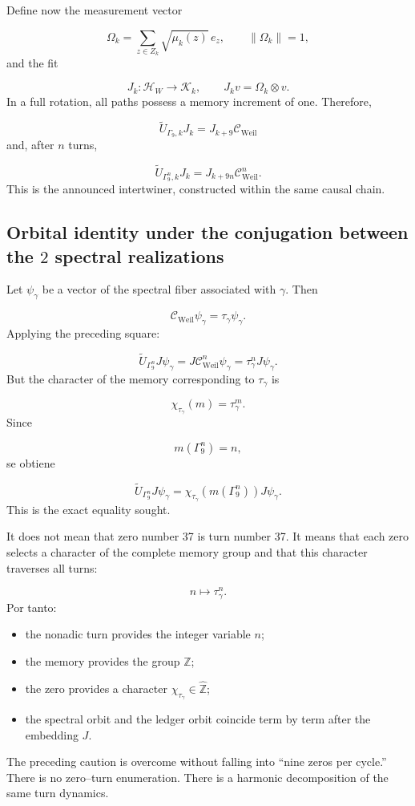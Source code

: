 Define now the measurement vector\par
\[
\Omega_k
=
\sum_{z\in Z_k}
\sqrt{\mu_k(z)}\,e_z,
\qquad
\|\Omega_k\|=1,
\]
and the fit\par
\[
J_k:\mathcal H_W\longrightarrow\mathscr K_k,
\qquad
J_kv=\Omega_k\otimes v.
\]
In a full rotation, all paths possess a memory increment of one. Therefore,\par
\[
\boxed{
\widetilde U_{\Gamma_9,k}J_k
=
J_{k+9}\mathcal C_{\mathrm{Weil}}
}
\]
and, after \(n\) turns,\par
\[
\boxed{
\widetilde U_{\Gamma_9^n,k}J_k
=
J_{k+9n}\mathcal C_{\mathrm{Weil}}^n.
}
\]
This is the announced intertwiner, constructed within the same causal chain.\par
{}
\subsection{Orbital identity under the conjugation between the \(2\) spectral realizations}
Let \(\psi_\gamma\) be a vector of the spectral fiber associated with \(\gamma\). Then\par
\[
\mathcal C_{\mathrm{Weil}}\psi_\gamma
=
\tau_\gamma\psi_\gamma.
\]
Applying the preceding square:\par
\[
\widetilde U_{\Gamma_9^n}J\psi_\gamma
=
J\mathcal C_{\mathrm{Weil}}^n\psi_\gamma
=
\tau_\gamma^nJ\psi_\gamma.
\]
But the character of the memory corresponding to \(\tau_\gamma\) is\par
\[
\chi_{\tau_\gamma}(m)
=
\tau_\gamma^m.
\]
Since\par
\[
m(\Gamma_9^n)=n,
\]
se obtiene\par
\[
\boxed{
\widetilde U_{\Gamma_9^n}J\psi_\gamma
=
\chi_{\tau_\gamma}
\!\left(m(\Gamma_9^n)\right)
J\psi_\gamma.
}
\]
This is the exact equality sought.\par
It does not mean that zero number 37 is turn number 37. It means that each zero selects a character of the complete memory group and that this character traverses all turns:\par
\[
n\longmapsto\tau_\gamma^n.
\]
Por tanto:\par
\begin{itemize}
\item the nonadic turn provides the integer variable \(n\);
\item the memory provides the group \(\mathbb Z\);
\item the zero provides a character \(\chi_{\tau_\gamma}\in\widehat{\mathbb Z}\);
\item the spectral orbit and the ledger orbit coincide term by term after the embedding \(J\).
\end{itemize}
The preceding caution is overcome without falling into “nine zeros per cycle.” There is no zero--turn enumeration. There is a harmonic decomposition of the same turn dynamics.\par
{}
